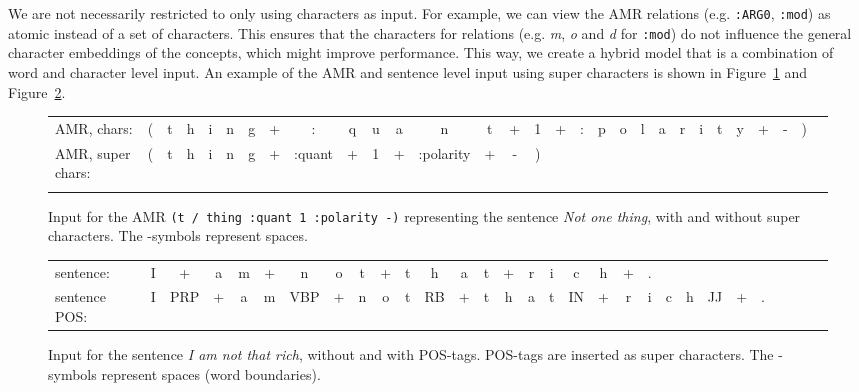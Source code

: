 \documentclass[a4paper,10pt,twoside]{article}
\begin{document}
We are not necessarily restricted to only using characters as input. For example, we can view the AMR relations (e.g. \texttt{:ARG0}, \texttt{:mod}) as atomic instead of a set of characters. This ensures that the characters for relations (e.g. \emph{m}, \emph{o} and \emph{d} for \texttt{:mod}) do not influence the general character embeddings of the concepts, which might improve performance. This way, we create a hybrid model that is a combination of word and character level input. An example of the AMR and sentence level input using super characters is shown in Figure~\ref{fig:superexample} and Figure~\ref{fig:posexample}.

\begin{figure}[htb]
\setlength{\arrayrulewidth}{0.01pt} 
\setlength{\tabcolsep}{1.2pt}
\begin{tabular}{p{3cm}*{29}{|c}|}
\toprule
\addlinespace
{}
AMR, chars: & ( & t & h & i & n & g & + & :      & q & u & a & n         & t & + & 1 & + & : & p & o & l & a & r & i & t & y & + & - & ) \\
\addlinespace
{}
AMR, super chars: & ( & t & h & i & n & g & + & :quant & + & 1 & + & :polarity & + & - & )\\
\addlinespace
\bottomrule
\end{tabular}
\setlength{\arrayrulewidth}{0.4pt}
\caption{\label{fig:supchar}\label{fig:superexample}
   Input for the AMR \texttt{(t / thing :quant 1 :polarity -)} representing the sentence \emph{Not one thing}, with and without super characters.
   The -symbols represent spaces.}
\end{figure}

\begin{figure}[htb]
\setlength{\arrayrulewidth}{0.01pt} 
\setlength{\tabcolsep}{1.2pt}
\begin{tabular}{p{3cm}*{29}{|c}|}
\toprule
\addlinespace
{}
sentence: & I & +   & a & m & + & n   & o & t & + & t & h  & a & t & + & r & i & c  & h & + & .   \\
\addlinespace
{}
sentence  POS: & I & PRP & + & a & m & VBP & + & n & o & t & RB & + & t & h & a & t & IN & + & r & i & c & h & JJ & + & . \\
\bottomrule
\end{tabular}
\setlength{\arrayrulewidth}{0.4pt}
\caption{\label{fig:posexample}Input for the sentence \emph{I am not that rich}, without and with POS-tags. POS-tags are inserted as super characters. The -symbols represent spaces (word boundaries).}
\end{figure}
\end{document}
